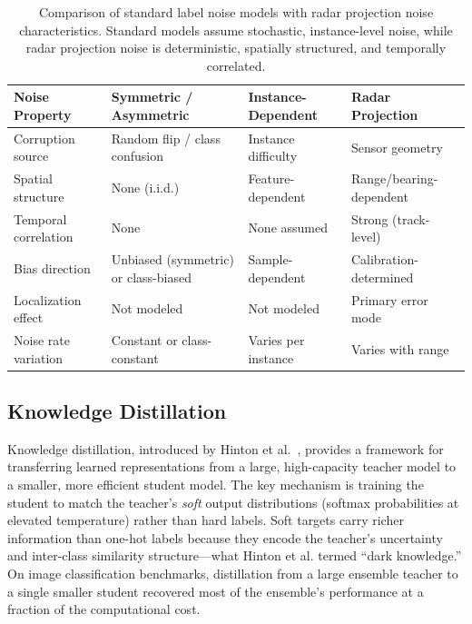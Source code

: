 \begin{table}[t]
\centering
\caption{Comparison of standard label noise models with radar projection noise characteristics. Standard models assume stochastic, instance-level noise, while radar projection noise is deterministic, spatially structured, and temporally correlated.}
\label{tab:noise_comparison}
\small
\begin{tabularx}{\textwidth}{@{}l X X X@{}}
\toprule
\textbf{Noise Property} & \textbf{Symmetric / Asymmetric} & \textbf{Instance-Dependent} & \textbf{Radar Projection} \\
\midrule
Corruption source & Random flip / class confusion & Instance difficulty & Sensor geometry \\
Spatial structure & None (i.i.d.) & Feature-dependent & Range/bearing-dependent \\
Temporal correlation & None & None assumed & Strong (track-level) \\
Bias direction & Unbiased (symmetric) or class-biased & Sample-dependent & Calibration-determined \\
Localization effect & Not modeled & Not modeled & Primary error mode \\
Noise rate variation & Constant or class-constant & Varies per instance & Varies with range \\
\bottomrule
\end{tabularx}
\end{table}



\subsection{Knowledge Distillation}\label{subsec:distillation}

Knowledge distillation, introduced by Hinton et al.~\cite{hinton2015distilling}, provides a framework for transferring learned representations from a large, high-capacity teacher model to a smaller, more efficient student model. The key mechanism is training the student to match the teacher's \emph{soft} output distributions (softmax probabilities at elevated temperature) rather than hard labels. Soft targets carry richer information than one-hot labels because they encode the teacher's uncertainty and inter-class similarity structure---what Hinton et al. termed ``dark knowledge.'' On image classification benchmarks, distillation from a large ensemble teacher to a single smaller student recovered most of the ensemble's performance at a fraction of the computational cost.

